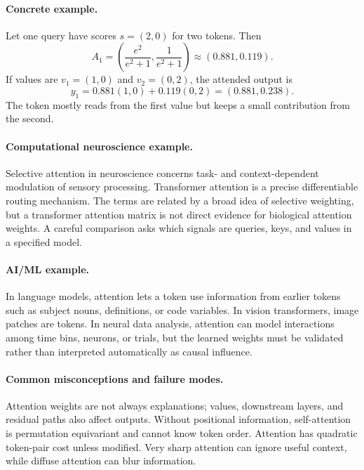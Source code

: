 \paragraph{Concrete example.}
Let one query have scores \(s=(2,0)\) for two tokens. Then
\[
A_1=\left(\frac{e^2}{e^2+1},\frac{1}{e^2+1}\right)\approx(0.881,0.119).
\]
If values are \(v_1=(1,0)\) and \(v_2=(0,2)\), the attended output is
\[
y_1=0.881(1,0)+0.119(0,2)=(0.881,0.238).
\]
The token mostly reads from the first value but keeps a small contribution from the second.

\paragraph{Computational neuroscience example.}
Selective attention in neuroscience concerns task- and context-dependent modulation of sensory processing. Transformer attention is a precise differentiable routing mechanism. The terms are related by a broad idea of selective weighting, but a transformer attention matrix is not direct evidence for biological attention weights. A careful comparison asks which signals are queries, keys, and values in a specified model.

\paragraph{AI/ML example.}
In language models, attention lets a token use information from earlier tokens such as subject nouns, definitions, or code variables. In vision transformers, image patches are tokens. In neural data analysis, attention can model interactions among time bins, neurons, or trials, but the learned weights must be validated rather than interpreted automatically as causal influence.

\paragraph{Common misconceptions and failure modes.}
Attention weights are not always explanations; values, downstream layers, and residual paths also affect outputs. Without positional information, self-attention is permutation equivariant and cannot know token order. Attention has quadratic token-pair cost unless modified. Very sharp attention can ignore useful context, while diffuse attention can blur information.

